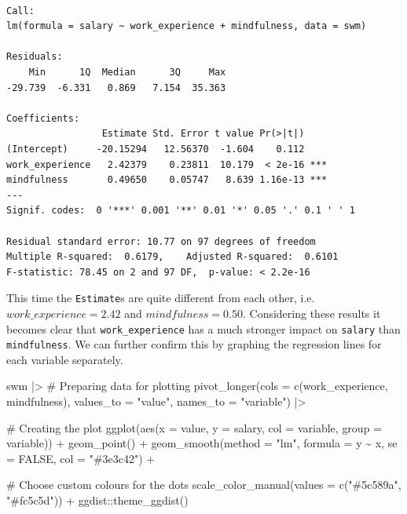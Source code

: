 \documentclass[
  letterpaper,
  DIV=11,
  numbers=noendperiod]{scrreprt}
\newenvironment{Shaded}{\begin{snugshade}}{\end{snugshade}}
\newcommand{\AttributeTok}[1]{\textcolor[rgb]{0.40,0.45,0.13}{#1}}
\newcommand{\CommentTok}[1]{\textcolor[rgb]{0.37,0.37,0.37}{#1}}
\newcommand{\ConstantTok}[1]{\textcolor[rgb]{0.56,0.35,0.01}{#1}}
\newcommand{\FunctionTok}[1]{\textcolor[rgb]{0.28,0.35,0.67}{#1}}
\newcommand{\NormalTok}[1]{\textcolor[rgb]{0.00,0.23,0.31}{#1}}
\newcommand{\SpecialCharTok}[1]{\textcolor[rgb]{0.37,0.37,0.37}{#1}}
\newcommand{\StringTok}[1]{\textcolor[rgb]{0.13,0.47,0.30}{#1}}
\begin{document}
\begin{verbatim}

Call:
lm(formula = salary ~ work_experience + mindfulness, data = swm)

Residuals:
    Min      1Q  Median      3Q     Max 
-29.739  -6.331   0.869   7.154  35.363 

Coefficients:
                 Estimate Std. Error t value Pr(>|t|)    
(Intercept)     -20.15294   12.56370  -1.604    0.112    
work_experience   2.42379    0.23811  10.179  < 2e-16 ***
mindfulness       0.49650    0.05747   8.639 1.16e-13 ***
---
Signif. codes:  0 '***' 0.001 '**' 0.01 '*' 0.05 '.' 0.1 ' ' 1

Residual standard error: 10.77 on 97 degrees of freedom
Multiple R-squared:  0.6179,    Adjusted R-squared:  0.6101 
F-statistic: 78.45 on 2 and 97 DF,  p-value: < 2.2e-16
\end{verbatim}

This time the \texttt{Estimate}s are quite different from each other,
i.e.~\(work\_experience = 2.42\) and \(mindfulness = 0.50\). Considering
these results it becomes clear that \texttt{work\_experience} has a much
stronger impact on \texttt{salary} than \texttt{mindfulness}. We can
further confirm this by graphing the regression lines for each variable
separately.

\begin{Shaded}
\begin{Highlighting}[]
\NormalTok{swm }\SpecialCharTok{|\textgreater{}}
  \CommentTok{\# Preparing data for plotting}
  \FunctionTok{pivot\_longer}\NormalTok{(}\AttributeTok{cols =} \FunctionTok{c}\NormalTok{(work\_experience, mindfulness),}
               \AttributeTok{values\_to =} \StringTok{"value"}\NormalTok{,}
               \AttributeTok{names\_to =} \StringTok{"variable"}\NormalTok{) }\SpecialCharTok{|\textgreater{}}
  
  \CommentTok{\# Creating the plot}
  \FunctionTok{ggplot}\NormalTok{(}\FunctionTok{aes}\NormalTok{(}\AttributeTok{x =}\NormalTok{ value,}
             \AttributeTok{y =}\NormalTok{ salary,}
             \AttributeTok{col =}\NormalTok{ variable,}
             \AttributeTok{group =}\NormalTok{ variable)) }\SpecialCharTok{+}
  \FunctionTok{geom\_point}\NormalTok{() }\SpecialCharTok{+}
  \FunctionTok{geom\_smooth}\NormalTok{(}\AttributeTok{method =} \StringTok{"lm"}\NormalTok{,}
              \AttributeTok{formula =}\NormalTok{ y }\SpecialCharTok{\textasciitilde{}}\NormalTok{ x,}
              \AttributeTok{se =} \ConstantTok{FALSE}\NormalTok{,}
              \AttributeTok{col =} \StringTok{"\#3e3c42"}\NormalTok{) }\SpecialCharTok{+}
  
  \CommentTok{\# Choose custom colours for the dots}
  \FunctionTok{scale\_color\_manual}\NormalTok{(}\AttributeTok{values =} \FunctionTok{c}\NormalTok{(}\StringTok{"\#5c589a"}\NormalTok{, }\StringTok{"\#fc5c5d"}\NormalTok{)) }\SpecialCharTok{+}
\NormalTok{  ggdist}\SpecialCharTok{::}\FunctionTok{theme\_ggdist}\NormalTok{()}
\end{Highlighting}
\end{Shaded}
\end{document}
